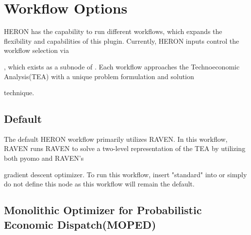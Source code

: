 \section{Workflow Options}
HERON has the capability to run different workflows, which expands the flexibility and capabilities of this plugin. Currently, HERON inputs control the workflow selection via

, which exists as a subnode of . Each workflow approaches the Technoeconomic Analysis(TEA) with a unique problem formulation and solution

technique.

\subsection{Default}
The default HERON workflow primarily utilizes RAVEN. In this workflow, RAVEN runs RAVEN to solve a two-level representation of the TEA by utilizing both pyomo and RAVEN's

gradient descent optimizer. To run this workflow, insert "standard" into  or simply do not define this node as this workflow will remain the default.

\subsection{Monolithic Optimizer for Probabilistic Economic Dispatch(MOPED)}

